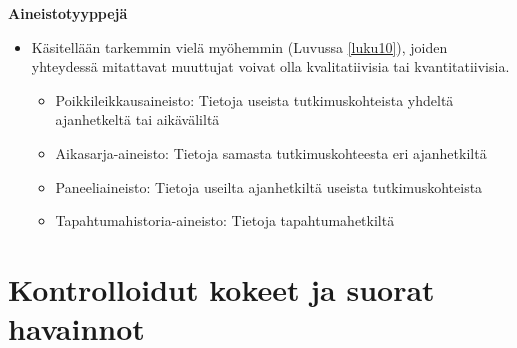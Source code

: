 \documentclass[
]{book}
\providecommand{\tightlist}{%
  \setlength{\itemsep}{0pt}\setlength{\parskip}{0pt}}
\begin{document}
\hfill\break
\textbf{Aineistotyyppejä}

\begin{itemize}
\tightlist
\item
  Käsitellään tarkemmin vielä myöhemmin (Luvussa \ref{luku10}), joiden yhteydessä mitattavat muuttujat voivat olla kvalitatiivisia tai kvantitatiivisia.

  \begin{itemize}
  \tightlist
  \item
    Poikkileikkausaineisto: Tietoja useista tutkimuskohteista yhdeltä ajanhetkeltä tai aikäväliltä
  \item
    Aikasarja-aineisto: Tietoja samasta tutkimuskohteesta eri ajanhetkiltä
  \item
    Paneeliaineisto: Tietoja useilta ajanhetkiltä useista tutkimuskohteista
  \item
    Tapahtumahistoria-aineisto: Tietoja tapahtumahetkiltä
  \end{itemize}
\end{itemize}

\hypertarget{alaluku54}{%
\section{Kontrolloidut kokeet ja suorat havainnot}\label{alaluku54}}
\end{document}
